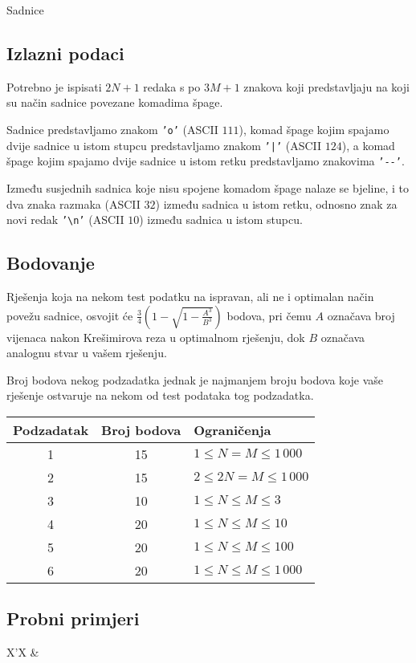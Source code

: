 \begin{statement}[
  problempoints=100,
  timelimit=3 sekunde,
  memorylimit=512 MiB,
]{Sadnice}
\subsection*{Izlazni podaci}
Potrebno je ispisati $2N+1$ redaka s po $3M+1$ znakova koji predstavljaju
na koji su način sadnice povezane komadima špage.

Sadnice predstavljamo znakom \texttt{'o'} (ASCII $111$), komad špage kojim
spajamo dvije sadnice u istom stupcu predstavljamo znakom \texttt{'|'} (ASCII
$124$), a komad špage kojim spajamo dvije sadnice u istom retku predstavljamo
znakovima \texttt{'-{}-'}.

Između susjednih sadnica koje nisu spojene komadom
špage nalaze se bjeline, i to dva znaka razmaka (ASCII $32$) između sadnica u
istom retku, odnosno znak za novi redak \texttt{'\textbackslash{}n'} (ASCII $10$)
između sadnica u istom stupcu.

\subsection*{Bodovanje}
Rješenja koja na nekom test podatku na ispravan, ali ne i optimalan način
povežu sadnice, osvojit će $\frac{3}{4}(1 - \sqrt{1 - \frac{A^3}{B^3}})$
bodova, pri čemu $A$ označava broj vijenaca nakon Krešimirova reza u optimalnom
rješenju, dok $B$ označava analognu stvar u vašem rješenju.

Broj bodova nekog podzadatka jednak je najmanjem broju bodova koje vaše rješenje
ostvaruje na nekom od test podataka tog podzadatka.

{\renewcommand{\arraystretch}{1.4}
  \setlength{\tabcolsep}{6pt}
  \begin{tabular}{ccl}
 Podzadatak & Broj bodova & Ograničenja \\ \midrule
  1 & 15 & $1 \le N = M \le 1\,000$ \\
  2 & 15 & $2 \le 2N = M \le 1\,000$ \\
  3 & 10 & $1 \le N \le M \le 3$ \\
  4 & 20 & $1 \le N \le M \le 10$ \\
  5 & 20 & $1 \le N \le M \le 100$ \\
  6 & 20 & $1 \le N \le M \le 1\,000$ \\
\end{tabular}}

\subsection*{Probni primjeri}
\begin{tabularx}{\textwidth}{X'X}
 &
\end{tabularx}


\end{statement}


